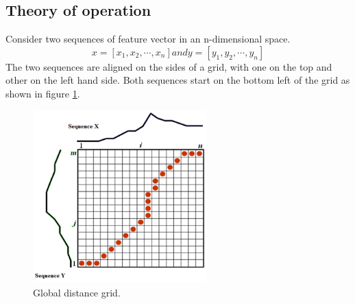 \documentclass[12pt, a4paper, twoside]{report}
\begin{document}
\subsection{Theory of operation}
Consider two sequences of feature vector in an n-dimensional space.
\begin{equation*}
x = [x_1, x_2, \cdots, x_n] and y = [y_1, y_2, \cdots, y_n]
\end{equation*}
The two sequences are aligned on the sides of a grid, with one on the top and other on the left hand side. Both sequences start on the bottom left of the grid as shown in figure \ref{fig:dtw-global-dist}.
\begin{figure}[H]
	\centering
	\includegraphics[width=0.6\textwidth]
	{images/chapter4/dtw-global-dist}
	\caption{Global distance grid.}
	\label{fig:dtw-global-dist}
\end{figure}
\end{document}

